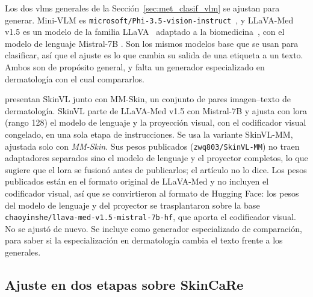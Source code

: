 Los dos \glspl{vlm} generales de la Sección~\ref{sec:met_clasif_vlm} se ajustan para generar. Mini-VLM es
\texttt{microsoft/Phi-3.5-vision-instruct}~\cite{abdin2024phi3}, y LLaVA-Med v1.5 es un modelo de la familia
LLaVA~\cite{liu2023visual} adaptado a la biomedicina~\cite{li2023llavamed}, con el modelo de lenguaje Mistral-7B
\cite{jiang2023mistral}. Son los mismos modelos base que se usan para clasificar, así que el ajuste es lo que cambia su
salida de una etiqueta a un texto. Ambos son de propósito general, y falta un generador especializado en dermatología
con el cual compararlos.

\textcite{zeng2025mmskin} presentan SkinVL junto con MM-Skin, un conjunto de pares imagen--texto de dermatología.
SkinVL parte de LLaVA-Med v1.5 con Mistral-7B y ajusta con \gls{lora} (rango 128) el modelo de lenguaje y la
proyección visual, con el codificador visual congelado, en una sola etapa de instrucciones. Se usa la variante
SkinVL-MM, ajustada solo con \emph{MM-Skin}. Sus pesos publicados (\texttt{zwq803/SkinVL-MM}) no traen adaptadores
separados sino el modelo de lenguaje y el proyector completos, lo que sugiere que el \gls{lora} se fusionó antes de
publicarlos; el artículo no lo dice. Los pesos publicados están en el formato original de LLaVA-Med y no incluyen el codificador visual, así que se
convirtieron al formato de Hugging Face: los pesos del modelo de lenguaje y del proyector se trasplantaron sobre la base
\texttt{chaoyinshe/llava-med-v1.5-mistral-7b-hf}, que aporta el codificador visual. No se ajustó de nuevo. Se incluye
como generador especializado de comparación, para saber si la especialización en dermatología cambia el texto frente
a los generales.

\subsection{Ajuste en dos etapas sobre SkinCaRe}

